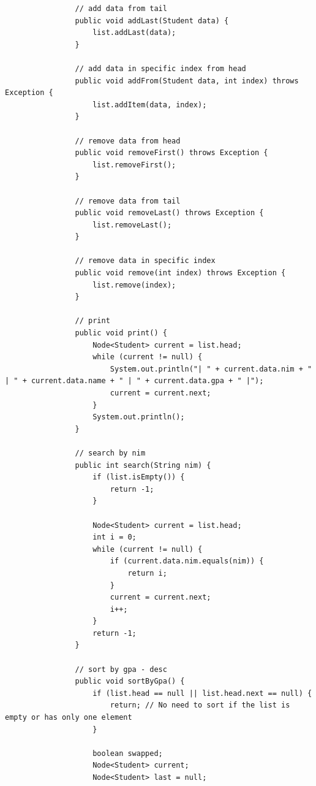 \documentclass[12pt,titlepage]{article}
\begin{document}
\begin{enumerate}
{\begin{verbatim}
                // add data from tail
                public void addLast(Student data) {
                    list.addLast(data);
                }

                // add data in specific index from head
                public void addFrom(Student data, int index) throws Exception {
                    list.addItem(data, index);
                }

                // remove data from head
                public void removeFirst() throws Exception {
                    list.removeFirst();
                }

                // remove data from tail
                public void removeLast() throws Exception {
                    list.removeLast();
                }

                // remove data in specific index
                public void remove(int index) throws Exception {
                    list.remove(index);
                }

                // print
                public void print() {
                    Node<Student> current = list.head;
                    while (current != null) {
                        System.out.println("| " + current.data.nim + " | " + current.data.name + " | " + current.data.gpa + " |");
                        current = current.next;
                    }
                    System.out.println();
                }

                // search by nim
                public int search(String nim) {
                    if (list.isEmpty()) {
                        return -1;
                    }

                    Node<Student> current = list.head;
                    int i = 0;
                    while (current != null) {
                        if (current.data.nim.equals(nim)) {
                            return i;
                        }
                        current = current.next;
                        i++;
                    }
                    return -1;
                }

                // sort by gpa - desc
                public void sortByGpa() {
                    if (list.head == null || list.head.next == null) {
                        return; // No need to sort if the list is empty or has only one element
                    }

                    boolean swapped;
                    Node<Student> current;
                    Node<Student> last = null;


\end{verbatim}}
\end{enumerate}
\end{document}
